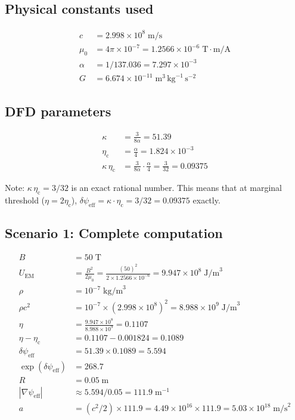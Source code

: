 \documentclass[12pt,a4paper]{article}
\newcommand{\psieff}{\psi_{\mathrm{eff}}}
\newcommand{\etac}{\eta_{\mathrm{c}}}
\begin{document}
\subsection{Physical constants used}
\begin{align}
c &= 2.998 \times 10^8 \;\text{m/s} \\
\mu_0 &= 4\pi \times 10^{-7} = 1.2566 \times 10^{-6} \;\text{T}\cdot\text{m/A} \\
\alpha &= 1/137.036 = 7.297 \times 10^{-3} \\
G &= 6.674 \times 10^{-11} \;\text{m}^3\,\text{kg}^{-1}\,\text{s}^{-2}
\end{align}

\subsection{DFD parameters}
\begin{align}
\kappa &= \frac{3}{8\alpha} = 51.39 \\
\etac &= \frac{\alpha}{4} = 1.824 \times 10^{-3} \\
\kappa\,\etac &= \frac{3}{8\alpha} \cdot \frac{\alpha}{4} = \frac{3}{32} = 0.09375
\end{align}

Note: $\kappa\,\etac = 3/32$ is an exact rational number. This means that at marginal threshold
($\eta = 2\etac$), $\delta\psieff = \kappa \cdot \etac = 3/32 = 0.09375$ exactly.

\subsection{Scenario 1: Complete computation}
\begin{align}
B &= 50 \;\text{T} \nonumber\\
U_{\mathrm{EM}} &= \frac{B^2}{2\mu_0} = \frac{(50)^2}{2 \times 1.2566 \times 10^{-6}} = 9.947 \times 10^8 \;\text{J/m}^3 \nonumber\\
\rho &= 10^{-7} \;\text{kg/m}^3 \nonumber\\
\rho c^2 &= 10^{-7} \times (2.998 \times 10^8)^2 = 8.988 \times 10^9 \;\text{J/m}^3 \nonumber\\
\eta &= \frac{9.947 \times 10^8}{8.988 \times 10^9} = 0.1107 \nonumber\\
\eta - \etac &= 0.1107 - 0.001824 = 0.1089 \nonumber\\
\delta\psieff &= 51.39 \times 0.1089 = 5.594 \nonumber\\
\exp(\delta\psieff) &= 268.7 \nonumber\\
R &= 0.05 \;\text{m} \nonumber\\
|\nabla\psieff| &\approx 5.594/0.05 = 111.9 \;\text{m}^{-1} \nonumber\\
a &= (c^2/2) \times 111.9 = 4.49 \times 10^{16} \times 111.9 = 5.03 \times 10^{18} \;\text{m/s}^2
\end{align}
\end{document}
